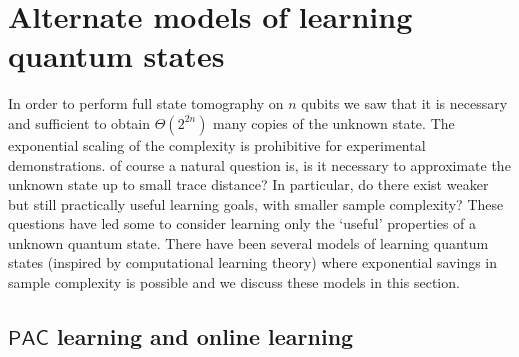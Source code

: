 \documentclass[11pt]{article}
\newcommand{\PAC}{\ensuremath{\mathsf{PAC}}}
\begin{document}
\section{Alternate models of learning quantum states}
\label{sec:alternatemodels}
In order to perform full state tomography on $n$ qubits we saw that it is necessary and sufficient to obtain $\Theta(2^{2n})$ many copies of the unknown state. The exponential scaling of the complexity is prohibitive for experimental demonstrations. of course a natural question is, is it  necessary to approximate the unknown state up to  small trace distance? In particular, do there exist weaker but still practically useful learning goals, with smaller sample complexity? These questions have led some to consider  learning only the `useful' properties of a unknown quantum state. There have been several models of learning quantum states (inspired by computational learning theory) where exponential savings in sample complexity is possible and we discuss these models in this section. 


\subsection{$\PAC$ learning and online learning}
\end{document}
